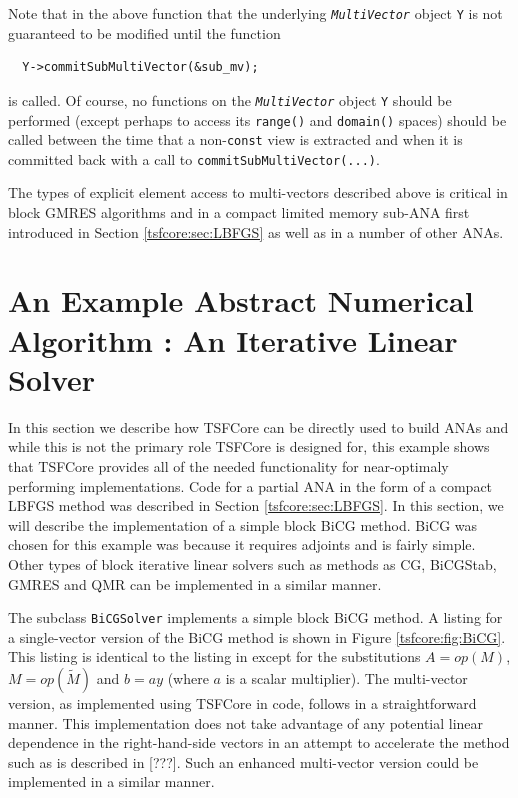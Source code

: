 Note that in the above function that the underlying
{}\texttt{\textit{Multi\-Vector}} object {}\texttt{Y} is not
guaranteed to be modified until the function

{\scriptsize\begin{verbatim}
  Y->commitSubMultiVector(&sub_mv);
\end{verbatim}}

{}\noindent{}is called.  Of course, no functions on the
{}\texttt{\textit{Multi\-Vector}} object {}\texttt{Y} should be
performed (except perhaps to access its {}\texttt{range()} and
{}\texttt{domain()} spaces) should be called between the time that a
non-\texttt{const} view is extracted and when it is committed back
with a call to {}\texttt{commit\-Sub\-Multi\-Vector(...)}.

The types of explicit element access to multi-vectors described above
is critical in block GMRES algorithms and in a compact limited memory
sub-ANA first introduced in Section {}\ref{tsfcore:sec:LBFGS} as well
as in a number of other ANAs.

%
\section{An Example Abstract Numerical Algorithm : An Iterative Linear Solver}
\label{tsfcore:sec:ANA_iter_solver_example}
%

In this section we describe how TSFCore can be directly used to build
ANAs and while this is not the primary role TSFCore is designed for,
this example shows that TSFCore provides all of the needed
functionality for near-optimaly performing implementations.  Code for
a partial ANA in the form of a compact LBFGS method was described in
Section {}\ref{tsfcore:sec:LBFGS}.  In this section, we will describe
the implementation of a simple block BiCG
{}\cite{ref:tmpls_for_iter_systems} method.  BiCG was chosen for this
example was because it requires adjoints and is fairly simple.  Other
types of block iterative linear solvers such as methods as CG,
BiCGStab, GMRES and QMR {}\cite{ref:tmpls_for_iter_systems} can be
implemented in a similar manner.

The subclass {}\texttt{BiCG\-Solver} implements a simple block BiCG
method.  A listing for a single-vector version of the BiCG method is
shown in Figure {}\ref{tsfcore:fig:BiCG}.  This listing is identical
to the listing in {}\cite{ref:tmpls_for_iter_systems} except for the
substitutions $A = op(M)$, $M = op(\tilde{M})$ and $b =a y$ (where $a$
is a scalar multiplier).  The multi-vector version, as implemented
using TSFCore in code, follows in a straightforward manner.  This
implementation does not take advantage of any potential linear
dependence in the right-hand-side vectors in an attempt to accelerate
the method such as is described in [???].  Such an enhanced
multi-vector version could be implemented in a similar manner.

